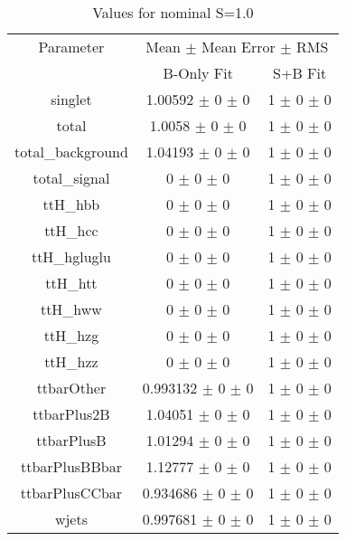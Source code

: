 \begin{table}
\centering
\caption{Values for nominal S=1.0}
\begin{tabular}{ccc}
\toprule
Parameter & \multicolumn{2}{c}{Mean $\pm$ Mean Error $\pm$ RMS}\\
 & B-Only Fit & S+B Fit\\
\midrule
singlet & \num{1.00592} $\pm$ \num{0} $\pm$ \num{0} & \num{1} $\pm$ \num{0} $\pm$ \num{0}\\
total & \num{1.0058} $\pm$ \num{0} $\pm$ \num{0} & \num{1} $\pm$ \num{0} $\pm$ \num{0}\\
total\_background & \num{1.04193} $\pm$ \num{0} $\pm$ \num{0} & \num{1} $\pm$ \num{0} $\pm$ \num{0}\\
total\_signal & \num{0} $\pm$ \num{0} $\pm$ \num{0} & \num{1} $\pm$ \num{0} $\pm$ \num{0}\\
ttH\_hbb & \num{0} $\pm$ \num{0} $\pm$ \num{0} & \num{1} $\pm$ \num{0} $\pm$ \num{0}\\
ttH\_hcc & \num{0} $\pm$ \num{0} $\pm$ \num{0} & \num{1} $\pm$ \num{0} $\pm$ \num{0}\\
ttH\_hgluglu & \num{0} $\pm$ \num{0} $\pm$ \num{0} & \num{1} $\pm$ \num{0} $\pm$ \num{0}\\
ttH\_htt & \num{0} $\pm$ \num{0} $\pm$ \num{0} & \num{1} $\pm$ \num{0} $\pm$ \num{0}\\
ttH\_hww & \num{0} $\pm$ \num{0} $\pm$ \num{0} & \num{1} $\pm$ \num{0} $\pm$ \num{0}\\
ttH\_hzg & \num{0} $\pm$ \num{0} $\pm$ \num{0} & \num{1} $\pm$ \num{0} $\pm$ \num{0}\\
ttH\_hzz & \num{0} $\pm$ \num{0} $\pm$ \num{0} & \num{1} $\pm$ \num{0} $\pm$ \num{0}\\
ttbarOther & \num{0.993132} $\pm$ \num{0} $\pm$ \num{0} & \num{1} $\pm$ \num{0} $\pm$ \num{0}\\
ttbarPlus2B & \num{1.04051} $\pm$ \num{0} $\pm$ \num{0} & \num{1} $\pm$ \num{0} $\pm$ \num{0}\\
ttbarPlusB & \num{1.01294} $\pm$ \num{0} $\pm$ \num{0} & \num{1} $\pm$ \num{0} $\pm$ \num{0}\\
ttbarPlusBBbar & \num{1.12777} $\pm$ \num{0} $\pm$ \num{0} & \num{1} $\pm$ \num{0} $\pm$ \num{0}\\
ttbarPlusCCbar & \num{0.934686} $\pm$ \num{0} $\pm$ \num{0} & \num{1} $\pm$ \num{0} $\pm$ \num{0}\\
wjets & \num{0.997681} $\pm$ \num{0} $\pm$ \num{0} & \num{1} $\pm$ \num{0} $\pm$ \num{0}\\
\bottomrule
\end{tabular}
\end{table}